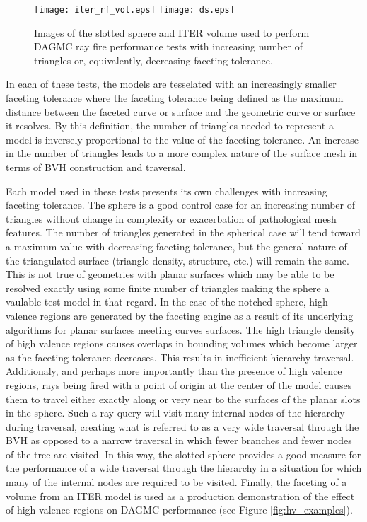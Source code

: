 \begin{figure}[H]
  \centering
    \texttt{[image: iter\_rf\_vol.eps]}
    \texttt{[image: ds.eps]}
\begin{center}
  \caption{Images of the slotted sphere and ITER volume used to perform DAGMC
    ray fire performance tests with increasing number of triangles or,
    equivalently, decreasing faceting tolerance.}
\end{center}
\label{fig:sj_hv_test_models}
\end{figure} 

In each of these tests, the models are tesselated with an increasingly smaller
faceting tolerance where the faceting tolerance being defined as the maximum
distance between the faceted curve or surface and the geometric curve or surface
it resolves.  By this definition, the number of triangles needed to represent a
model is inversely proportional to the value of the faceting tolerance. An
increase in the number of triangles leads to a more complex nature of the
surface mesh in terms of BVH construction and traversal.

Each model used in these tests presents its own challenges with increasing
faceting tolerance. The sphere is a good control case for an increasing number
of triangles without change in complexity or exacerbation of pathological mesh
features. The number of triangles generated in the spherical case will tend
toward a maximum value with decreasing faceting tolerance, but the general
nature of the triangulated surface (triangle density, structure, etc.)  will
remain the same. This is not true of geometries with planar surfaces which may
be able to be resolved exactly using some finite number of triangles making the
sphere a vaulable test model in that regard. In the case of the notched sphere,
high-valence regions are generated by the faceting engine as a result of its
underlying algorithms for planar surfaces meeting curves surfaces. The high
triangle density of high valence regions causes overlaps in bounding volumes
which become larger as the faceting tolerance decreases. This results in
inefficient hierarchy traversal. Additionaly, and perhaps more importantly than
the presence of high valence regions, rays being fired with a point of origin at
the center of the model causes them to travel either exactly along or very near
to the surfaces of the planar slots in the sphere. Such a ray query will visit
many internal nodes of the hierarchy during traversal, creating what is referred
to as a very wide traversal through the BVH as opposed to a narrow traversal in
which fewer branches and fewer nodes of the tree are visited. In this way, the
slotted sphere provides a good measure for the performance of a wide traversal
through the hierarchy in a situation for which many of the internal nodes are
required to be visited. Finally, the faceting of a volume from an ITER model is
used as a production demonstration of the effect of high valence regions on
DAGMC performance (see Figure \ref{fig:hv_examples}).

